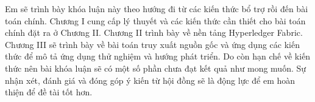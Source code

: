 Em sẽ trình bày khóa luận này theo hướng đi từ các kiến thức bổ trợ rồi đến bài toán chính.
Chương I cung cấp lý thuyết và các kiến thức cần thiết cho bài toán chính đặt ra ở Chương II.
Chương II trình bày về nền tảng Hyperledger Fabric.
Chương III sẽ trình bày về bài toán truy xuất nguồn gốc và ứng dụng các kiến thức để mô tả ứng dụng thử nghiệm và hướng phát triển.
Do còn hạn chế về kiến thức nên bài khóa luận sẽ có một số phần chưa đạt kết quả như mong muốn. 
Sự nhận xét, đánh giá và đóng góp ý kiến từ hội đồng sẽ là động lực để em hoàn thiện để
đề tài tốt hơn.
